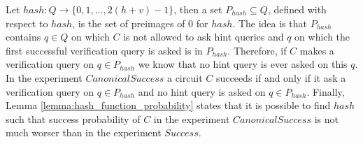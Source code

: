 
Let $hash:Q\rightarrow\{0,1,\dots, 2(h+v)-1\}$, then a set $P_{hash} \subseteq Q$,
defined with respect to $hash$, is the set of preimages of $0$ for $hash$.
The idea is that $P_{hash}$ contains $q \in Q$ on which $C$ is not allowed to ask hint queries and $q$ on which the
first successful verification query is asked is in $P_{hash}$.
Therefore, if $C$ makes a verification query on $q \in P_{hash}$ we know that no hint query is ever asked on this $q$.
In the experiment $CanonicalSuccess$ a circuit $C$ succeeds if and only if it ask a verification query on $q \in P_{hash}$
and no hint query is asked on $q \in P_{hash}$.
Finally, Lemma \ref{lemma:hash_function_probability} states that
it is possible to find $hash$ such that success probability of $C$ in the experiment $CanonicalSuccess$ is
not much worser than in the experiment $Success$.

